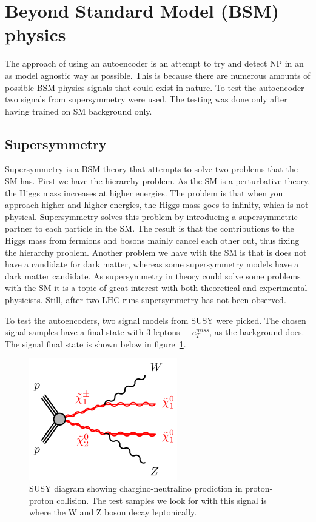 \section{Beyond Standard Model (BSM) physics}
The approach of using an autoencoder is an attempt to try and detect NP in an as model agnostic way as possible. This is because there are 
numerous amounts of possible BSM physics signals that could exist in nature. To test the autoencoder two 
signals from supersymmetry were used. The testing was done only after having trained on SM background only.
\subsection*{Supersymmetry}
Supersymmetry is a BSM theory that attempts to solve two problems that the SM has. 
First we have the hierarchy problem. As the SM is a perturbative theory, the Higgs mass increases at 
higher energies. The problem is that when you approach higher and higher energies, the Higgs mass goes to infinity, 
which is not physical. Supersymmetry solves this problem by introducing a supersymmetric partner to each particle
in the SM. The result is that the contributions to the Higgs mass from fermions and bosons mainly cancel each other out, 
thus fixing the hierarchy problem. Another problem we have with the SM
is that is does not have a candidate for dark matter, whereas some supersymmetry models have a dark matter candidate.
As supersymmetry in theory could solve some problems with the SM it is a topic of great interest with both theoretical and 
experimental physicists. Still, after two LHC runs supersymmetry has not been observed\cite{atlas_search_2021}. \par 

To test the autoencoders, two signal models from SUSY were picked. The chosen signal samples have a final state with 3 leptons + $e_T^{miss}$,
as the background does. The signal final state is shown below in figure \ref{fig:sysy_feyn}. 

\begin{figure}[H]
    \centering
    \includegraphics[width=0.4\linewidth]{Figures/susy/C1N2-WZN1N1.png}
    \caption[SUSY feynman diagram]{SUSY diagram showing chargino-neutralino prodiction in proton-proton collision. 
    The test samples we look for with this signal is where the W and Z boson decay leptonically.}
    \label{fig:sysy_feyn}
\end{figure}

